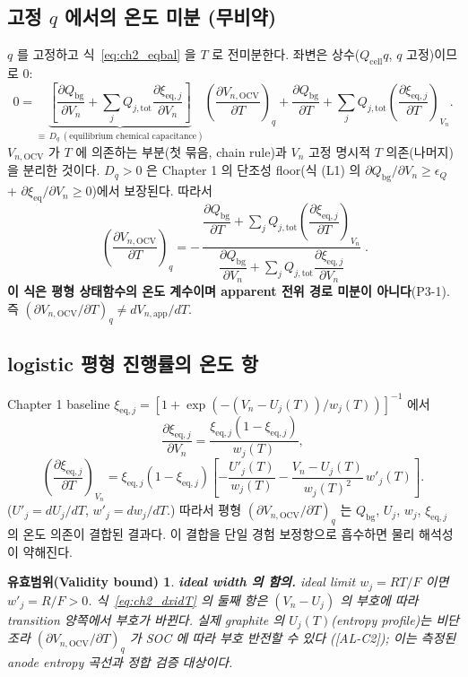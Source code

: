 \documentclass[11pt,a4paper]{article}
\newtheorem*{boundbox}{유효범위(Validity bound)}
\newcommand{\eq}{\mathrm{eq}}
\newcommand{\app}{\mathrm{app}}
\newcommand{\tot}{\mathrm{tot}}
\newcommand{\bg}{\mathrm{bg}}
\newcommand{\cell}{\mathrm{cell}}
\newcommand{\OCV}{\mathrm{OCV}}
\newcommand{\AL}[1]{\textsf{[AL-#1]}}
\begin{document}
\subsection{고정 $q$ 에서의 온도 미분 (무비약)}
$q$ 를 고정하고 식~\eqref{eq:ch2_eqbal} 을 $T$ 로 전미분한다. 좌변은 상수($Q_\cell q$, $q$ 고정)이므로 $0$:
\begin{equation}
0=\underbrace{\left[\frac{\partial Q_\bg}{\partial V_n}+\sum_{j}Q_{j,\tot}\frac{\partial\xi_{\eq,j}}{\partial V_n}\right]}_{\equiv\,D_q\ (\text{equilibrium chemical capacitance})}
\left(\frac{\partial V_{n,\OCV}}{\partial T}\right)_q
+\frac{\partial Q_\bg}{\partial T}+\sum_{j}Q_{j,\tot}\left(\frac{\partial\xi_{\eq,j}}{\partial T}\right)_{V_n}.
\label{eq:ch2_implicitT}
\end{equation}
$V_{n,\OCV}$ 가 $T$ 에 의존하는 부분(첫 묶음, chain rule)과 $V_n$ 고정 명시적 $T$ 의존(나머지)을 분리한 것이다.
$D_q>0$ 은 Chapter 1 의 단조성 floor(식 (L1) 의 $\partial Q_\bg/\partial V_n\ge\epsilon_Q$ + $\partial\xi_\eq/\partial V_n\ge0$)에서 보장된다. 따라서
\begin{equation}
\boxed{\;\left(\frac{\partial V_{n,\OCV}}{\partial T}\right)_q
=-\,\frac{\dfrac{\partial Q_\bg}{\partial T}+\displaystyle\sum_{j}Q_{j,\tot}\left(\dfrac{\partial\xi_{\eq,j}}{\partial T}\right)_{V_n}}
{\dfrac{\partial Q_\bg}{\partial V_n}+\displaystyle\sum_{j}Q_{j,\tot}\dfrac{\partial\xi_{\eq,j}}{\partial V_n}}\;.}
\label{eq:ch2_dVocvdT}
\end{equation}
\textbf{이 식은 평형 상태함수의 온도 계수이며 apparent 전위 경로 미분이 아니다}(P3-1). 즉
$(\partial V_{n,\OCV}/\partial T)_q\ne dV_{n,\app}/dT$.

\subsection{logistic 평형 진행률의 온도 항}
Chapter 1 baseline $\xi_{\eq,j}=[1+\exp(-(V_n-U_j(T))/w_j(T))]^{-1}$ 에서
\begin{equation}
\frac{\partial\xi_{\eq,j}}{\partial V_n}=\frac{\xi_{\eq,j}(1-\xi_{\eq,j})}{w_j(T)},
\label{eq:ch2_dxidV}
\end{equation}
\begin{equation}
\left(\frac{\partial\xi_{\eq,j}}{\partial T}\right)_{V_n}
=\xi_{\eq,j}(1-\xi_{\eq,j})\left[-\frac{U'_j(T)}{w_j(T)}-\frac{V_n-U_j(T)}{w_j(T)^2}\,w'_j(T)\right].
\label{eq:ch2_dxidT}
\end{equation}
($U'_j=dU_j/dT$, $w'_j=dw_j/dT$.) 따라서 평형 $(\partial V_{n,\OCV}/\partial T)_q$ 는 $Q_\bg$, $U_j$, $w_j$,
$\xi_{\eq,j}$ 의 온도 의존이 결합된 결과다. 이 결합을 단일 경험 보정항으로 흡수하면 물리 해석성이 약해진다.
\begin{boundbox}
\textbf{ideal width 의 함의.} ideal limit $w_j=RT/F$ 이면 $w'_j=R/F>0$. 식~\eqref{eq:ch2_dxidT} 의 둘째 항은
$(V_n-U_j)$ 의 부호에 따라 transition 양쪽에서 부호가 바뀐다. 실제 graphite 의 $U_j(T)$(entropy
profile)는 비단조라 $(\partial V_{n,\OCV}/\partial T)_q$ 가 SOC 에 따라 부호 반전할 수 있다
\cite{thomasnewman2003,reynier2004}(\AL{C2}); 이는 측정된 anode entropy 곡선과 정합 검증 대상이다.
\end{boundbox}
\end{document}
